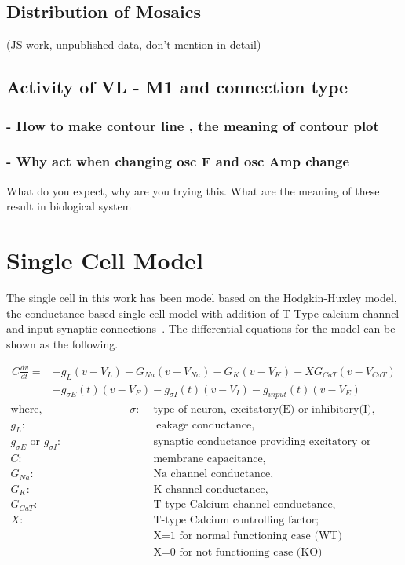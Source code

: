\subsection{Distribution of Mosaics}
(JS work, unpublished data, don't mention in detail)

\subsection{Activity of VL - M1 and connection type }
\subsubsection{- How to make contour line , the meaning of contour plot}
\subsubsection{- Why act when changing osc F and osc Amp change}
What do you expect, why are you trying this.
What are the meaning of these result in biological system



\section{Single Cell Model}

The single cell in this work has been model based on the Hodgkin-Huxley model, the conductance-based single cell model with addition of T-Type calcium channel and input synaptic connections~\cite{hodgkin1952quantitative, wang1991model, paik2009spontaneous}. The differential equations for the model can be shown as the following.

\begin{align*}
C\frac{dv}{dt}=&-g_L(v - V_L) - G_{Na}(v - V_{Na}) - G_K(v - V_K) - XG_{CaT}(v - V_{CaT}) \\
&- g_{\sigma E}(t)(v - V_E) - g_{\sigma I}(t)(v - V_I) - g_{input}(t)(v - V_E)
\end{align*}
\begin{align*}
	\text{where,} \hspace{8em} \sigma :& \text{ type of neuron, excitatory(E) or inhibitory(I),}  \\
	g_L :& \text{ leakage conductance,} \\
	g_{\sigma E} \text{ or } g_{\sigma I} :& \text{ synaptic conductance providing excitatory or inhibitory input} \\
	C :& \text{ membrane capacitance,}\\
	G_{Na} :& \text{ Na channel conductance,}\\
	G_{K} :& \text{ K channel conductance,}\\
	G_{CaT} :& \text{ T-type Calcium channel conductance,}\\
	X :& \text{ T-type Calcium controlling factor;}\\
	   &  \text{ X=1 for normal functioning case (WT) }\\
	   &  \text{ X=0 for not functioning case (KO) }\\
\end{align*}

